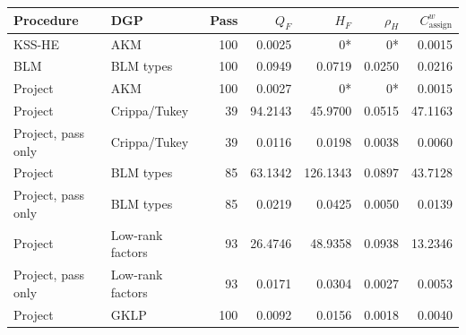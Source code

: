 \begin{tabular}{llrrrrr}
\toprule
Procedure & DGP & Pass & $Q_F$ & $H_F$ & $\rho_H$ & $C^w_{\mathrm{assign}}$ \\
\midrule
KSS-HE & AKM & 100 & 0.0025 & 0* & 0* & 0.0015 \\
BLM & BLM types & 100 & 0.0949 & 0.0719 & 0.0250 & 0.0216 \\
Project & AKM & 100 & 0.0027 & 0* & 0* & 0.0015 \\
Project & Crippa/Tukey & 39 & 94.2143 & 45.9700 & 0.0515 & 47.1163 \\
Project, pass only & Crippa/Tukey & 39 & 0.0116 & 0.0198 & 0.0038 & 0.0060 \\
Project & BLM types & 85 & 63.1342 & 126.1343 & 0.0897 & 43.7128 \\
Project, pass only & BLM types & 85 & 0.0219 & 0.0425 & 0.0050 & 0.0139 \\
Project & Low-rank factors & 93 & 26.4746 & 48.9358 & 0.0938 & 13.2346 \\
Project, pass only & Low-rank factors & 93 & 0.0171 & 0.0304 & 0.0027 & 0.0053 \\
Project & GKLP & 100 & 0.0092 & 0.0156 & 0.0018 & 0.0040 \\
\bottomrule
\end{tabular}

